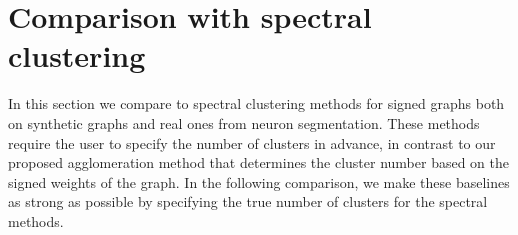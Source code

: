 






\section{Comparison with spectral clustering} \label{sec:spectral_clust}
In this section we compare \algname{} to spectral clustering methods for signed graphs both on synthetic graphs and real ones from neuron segmentation. These methods require the user to specify the number of clusters in advance, in contrast to our proposed agglomeration method that determines the cluster number based on the signed weights of the graph. In the following comparison, we make these baselines as strong as possible by specifying the true number of clusters for the spectral methods.

